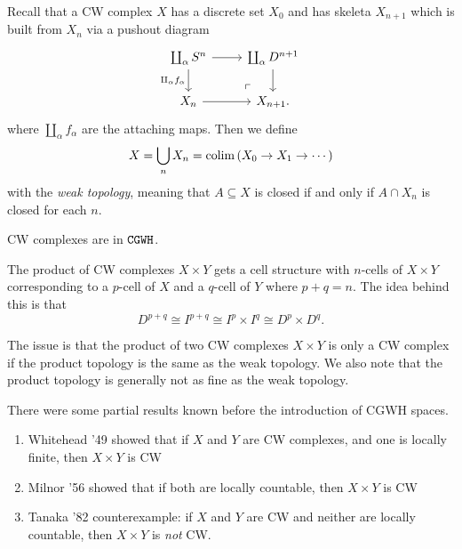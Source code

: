 \documentclass{article}[11pt]
\begin{document}
\begin{example} Recall that a CW complex $X$ has a discrete set $X_0$ and has skeleta $X_{n+1}$ which is built from $X_n$ via a pushout diagram
\[
	\begin{tikzcd}
	\coprod_\alpha S^n \dar["\amalg_\alpha f_\alpha" left]\rar & \coprod_\alpha D^{n+1}\dar \\
	X_n\rar & X_{n+1} \po.
	\end{tikzcd}
\]
where $\amalg_\alpha f_\alpha$ are the attaching maps. Then we define
\begin{align*}
	X = \bigcup_n X_n = \mathop{\operatorname*{colim}} \left( X_0 \to X_1 \to \cdots \right)
\end{align*}
with the \textit{weak topology}, meaning that $A\subseteq X$ is closed if and only if $A\cap X_n$ is closed for each $n$.
\end{example}


\begin{proposition} CW complexes are in $\texttt{CGWH}$.
\end{proposition}

\begin{note} The product of CW complexes $X\times Y$ gets a cell structure with $n$-cells of $X\times Y$ corresponding to a $p$-cell of $X$ and a $q$-cell of $Y$ where $p+q=n$. The idea behind this is that
\[
    D^{p+q} \cong I^{p+q} \cong I^p \times I^q \cong D^p \times D^q.
\]
\end{note}

The issue is that the product of two CW complexes $X\times Y$ is only a CW complex if the product topology is the same as the weak topology. We also note that the product topology is generally not as fine as the weak topology.


There were some partial results known before the introduction of CGWH spaces.
\vspace{-1em}
\begin{enumerate}\itemsep0em
	\item Whitehead '49 showed that if $X$ and $Y$ are CW complexes, and one is locally finite, then $X\times Y$ is CW
	\item Milnor '56 showed that if both are locally countable, then $X\times Y$ is CW
	\item Tanaka '82 counterexample: if $X$ and $Y$ are CW and neither are locally countable, then $X\times Y$ is \textit{not} CW.
\end{enumerate}
\end{document}
